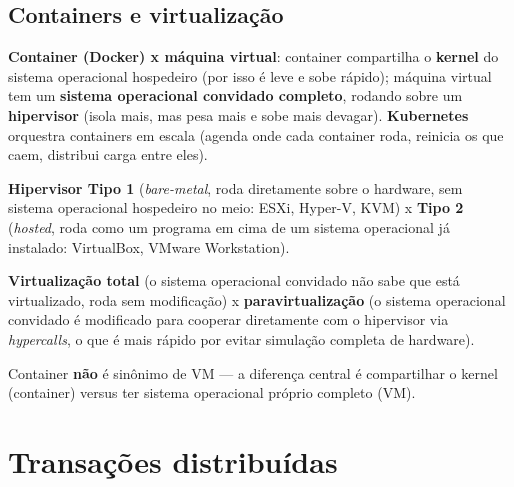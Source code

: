 \subsection{Containers e virtualização}

\begin{conceito}
\textbf{Container (Docker) x máquina virtual}: container compartilha o
\textbf{kernel} do sistema operacional hospedeiro (por isso é leve e sobe
rápido); máquina virtual tem um \textbf{sistema operacional convidado
completo}, rodando sobre um \textbf{hipervisor} (isola mais, mas pesa mais
e sobe mais devagar). \textbf{Kubernetes} orquestra containers em escala
(agenda onde cada container roda, reinicia os que caem, distribui carga
entre eles).

\textbf{Hipervisor Tipo 1} (\textit{bare-metal}, roda diretamente sobre o
hardware, sem sistema operacional hospedeiro no meio: ESXi, Hyper-V, KVM)
x \textbf{Tipo 2} (\textit{hosted}, roda como um programa em cima de um
sistema operacional já instalado: VirtualBox, VMware Workstation).

\textbf{Virtualização total} (o sistema operacional convidado não sabe que
está virtualizado, roda sem modificação) x \textbf{paravirtualização} (o
sistema operacional convidado é modificado para cooperar diretamente com o
hipervisor via \textit{hypercalls}, o que é mais rápido por evitar
simulação completa de hardware).
\end{conceito}

\begin{cuidado}
Container \textbf{não} é sinônimo de VM --- a diferença central é
compartilhar o kernel (container) versus ter sistema operacional próprio
completo (VM).
\end{cuidado}

\section{Transações distribuídas}
\label{sec:transacoes-dist}

